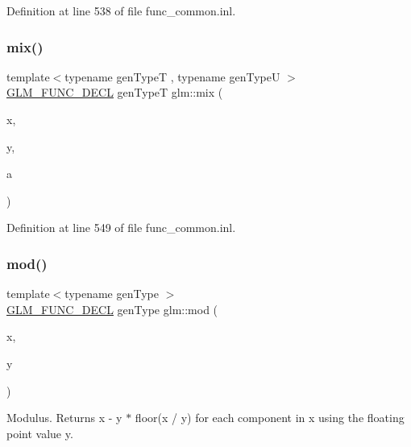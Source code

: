 Definition at line 538 of file func\+\_\+common.\+inl.

\mbox{\label{group__core__func__common_ga78aae7eea618ca112053d59fe03db239}} 
\subsubsection{\texorpdfstring{mix()}{mix()}\hspace{0.1cm}{\footnotesize\ttfamily [3/3]}}
{\footnotesize\ttfamily template$<$typename gen\+TypeT , typename gen\+TypeU $>$ \\
\hyperlink{setup_8hpp_ab2d052de21a70539923e9bcbf6e83a51}{G\+L\+M\+\_\+\+F\+U\+N\+C\+\_\+\+D\+E\+CL} gen\+TypeT glm\+::mix (\begin{DoxyParamCaption}\item[{gen\+TypeT const \&}]{x,  }\item[{gen\+TypeT const \&}]{y,  }\item[{gen\+TypeU const \&}]{a }\end{DoxyParamCaption})}



Definition at line 549 of file func\+\_\+common.\+inl.

\mbox{\label{group__core__func__common_ga8cc8a75b05125fe1c30de43102ef42e1}} 
\subsubsection{\texorpdfstring{mod()}{mod()}\hspace{0.1cm}{\footnotesize\ttfamily [1/2]}}
{\footnotesize\ttfamily template$<$typename gen\+Type $>$ \\
\hyperlink{setup_8hpp_ab2d052de21a70539923e9bcbf6e83a51}{G\+L\+M\+\_\+\+F\+U\+N\+C\+\_\+\+D\+E\+CL} gen\+Type glm\+::mod (\begin{DoxyParamCaption}\item[{gen\+Type const \&}]{x,  }\item[{gen\+Type const \&}]{y }\end{DoxyParamCaption})}

Modulus. Returns x -\/ y $\ast$ floor(x / y) for each component in x using the floating point value y.


